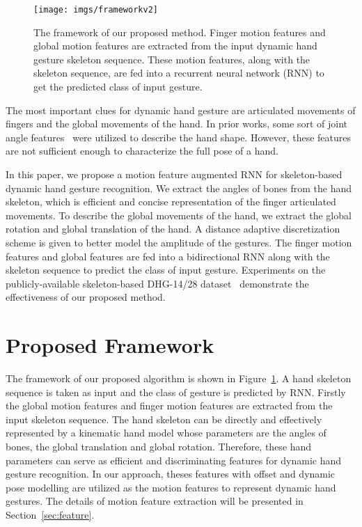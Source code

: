 \documentclass{article}
\begin{document}
\begin{figure}[t]
  \centering
  \centerline{\texttt{[image: imgs/frameworkv2]}}
\caption{The framework of our proposed method. Finger motion features and global motion features are extracted from the input dynamic hand gesture skeleton sequence. These motion features, along with the skeleton sequence, are fed into a recurrent neural network (RNN) to get the predicted class of input gesture.}
\label{fig:framework}
\end{figure}

The most important clues for dynamic hand gesture are articulated movements of fingers and the global movements of the hand.
In prior works, some sort of joint angle features~\cite{dong2015american, lu2016dynamic} were utilized to describe the hand shape.
However, these features are not sufficient enough to characterize the full pose of a hand.

In this paper, we propose a motion feature augmented RNN for skeleton-based dynamic hand gesture recognition. We extract the angles of bones from the hand skeleton, which is efficient and concise representation of the finger articulated movements. To describe the global movements of the hand, we extract the global rotation and global translation of the hand. A distance adaptive discretization scheme is given to better model the amplitude of the gestures. The finger motion features and global features are fed into a bidirectional RNN along with the skeleton sequence to predict the class of input gesture. Experiments on the publicly-available skeleton-based DHG-14/28 dataset~\cite{de2016skeleton} demonstrate the effectiveness of our proposed method.


\section{Proposed Framework}
\label{sec:framework}
The framework of our proposed algorithm is shown in Figure~\ref{fig:framework}. A hand skeleton sequence is taken as input and the class of gesture is predicted by RNN. Firstly the global motion features and finger motion features are extracted from the input skeleton sequence.
The hand skeleton can be directly and effectively represented by a kinematic hand model whose parameters are the angles of bones, the global translation and global rotation\cite{tang2015opening,YeSpatialHandECCV2016}. Therefore, these hand parameters can serve as efficient and discriminating features for dynamic hand gesture recognition. In our approach, theses features with offset and dynamic pose modelling are utilized as the motion features to represent dynamic hand gestures.
The details of motion feature extraction will be presented in Section~\ref{sec:feature}.
\end{document}
